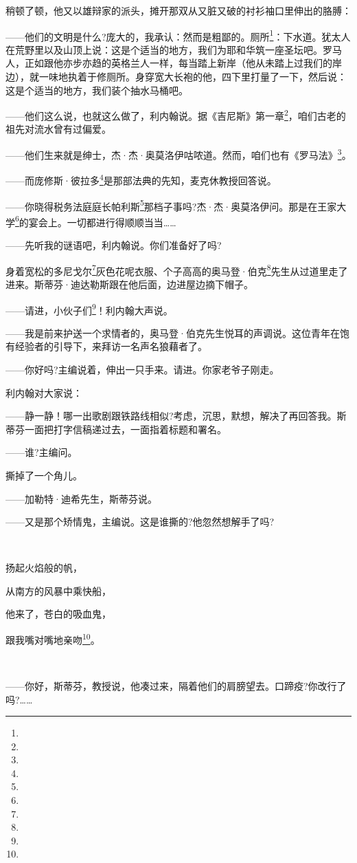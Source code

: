 \par 稍顿了顿，他又以雄辩家的派头，摊开那双从又脏又破的衬衫袖口里伸出的胳膊：
\par ——他们的文明是什么?庞大的，我承认：然而是粗鄙的。厕所\footnote{}：下水道。犹太人在荒野里以及山顶上说：这是个适当的地方，我们为耶和华筑一座圣坛吧。罗马人，正如跟他亦步亦趋的英格兰人一样，每当踏上新岸（他从未踏上过我们的岸边），就一味地执着于修厕所。身穿宽大长袍的他，四下里打量了一下，然后说：这是个适当的地方，我们装个抽水马桶吧。
\par ——他们这么说，也就这么做了，利内翰说。据《吉尼斯》第一章\footnote{}，咱们古老的祖先对流水曾有过偏爱。
\par ——他们生来就是绅士，杰·杰·奥莫洛伊咕哝道。然而，咱们也有《罗马法》\footnote{}。
\par ——而庞修斯·彼拉多\footnote{}是那部法典的先知，麦克休教授回答说。
\par ——你晓得税务法庭庭长帕利斯\footnote{}那档子事吗?杰·杰·奥莫洛伊问。那是在王家大学\footnote{}的宴会上。一切都进行得顺顺当当……
\par ——先听我的谜语吧，利内翰说。你们准备好了吗?
\par 身着宽松的多尼戈尔\footnote{}灰色花呢衣服、个子高高的奥马登·伯克\footnote{}先生从过道里走了进来。斯蒂芬·迪达勒斯跟在他后面，边进屋边摘下帽子。
\par ——请进，小伙子们\footnote{}！利内翰大声说。
\par ——我是前来护送一个求情者的，奥马登·伯克先生悦耳的声调说。这位青年在饱有经验者的引导下，来拜访一名声名狼藉者了。
\par ——你好吗?主编说着，伸出一只手来。请进。你家老爷子刚走。
\par 利内翰对大家说：
\par ——静一静！哪一出歌剧跟铁路线相似?考虑，沉思，默想，解决了再回答我。斯蒂芬一面把打字信稿递过去，一面指着标题和署名。
\par ——谁?主编问。
\par 撕掉了一个角儿。
\par ——加勒特·迪希先生，斯蒂芬说。
\par ——又是那个矫情鬼，主编说。这是谁撕的?他忽然想解手了吗?
\par  
\par 扬起火焰般的帆，
\par 从南方的风暴中乘快船，
\par 他来了，苍白的吸血鬼，
\par 跟我嘴对嘴地亲吻\footnote{}。
\par  
\par ——你好，斯蒂芬，教授说，他凑过来，隔着他们的肩膀望去。口蹄疫?你改行了吗?……
